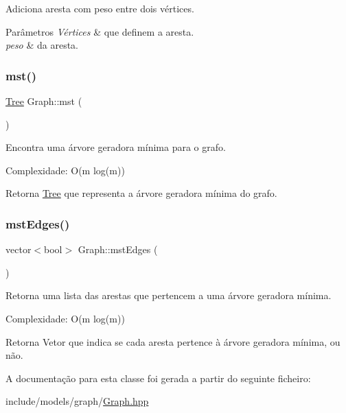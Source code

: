 Adiciona aresta com peso entre dois vértices. 
\begin{DoxyParams}{Parâmetros}
{\em Vértices} & que definem a aresta. \\
\hline
{\em peso} & da aresta. \\
\hline
\end{DoxyParams}
\mbox{\label{classGraph_a59f3bafa5e1935a2de4313b43219c4d6}} 
\subsubsection{\texorpdfstring{mst()}{mst()}}
{\footnotesize\ttfamily \mbox{\hyperlink{classTree}{Tree}} Graph\+::mst (\begin{DoxyParamCaption}{ }\end{DoxyParamCaption})}

Encontra uma árvore geradora mínima para o grafo.

Complexidade\+: O(m log(m)) \begin{DoxyReturn}{Retorna}
\mbox{\hyperlink{classTree}{Tree}} que representa a árvore geradora mínima do grafo. 
\end{DoxyReturn}
\mbox{\label{classGraph_a645760818f3f2a20f8593b6b2a65c2d8}} 
\subsubsection{\texorpdfstring{mstEdges()}{mstEdges()}}
{\footnotesize\ttfamily vector$<$bool$>$ Graph\+::mst\+Edges (\begin{DoxyParamCaption}{ }\end{DoxyParamCaption})}

Retorna uma lista das arestas que pertencem a uma árvore geradora mínima.

Complexidade\+: O(m log(m)) \begin{DoxyReturn}{Retorna}
Vetor que indica se cada aresta pertence à árvore geradora mínima, ou não. 
\end{DoxyReturn}


A documentação para esta classe foi gerada a partir do seguinte ficheiro\+:\begin{DoxyCompactItemize}
\item 
include/models/graph/\mbox{\hyperlink{Graph_8hpp}{Graph.\+hpp}}\end{DoxyCompactItemize}
